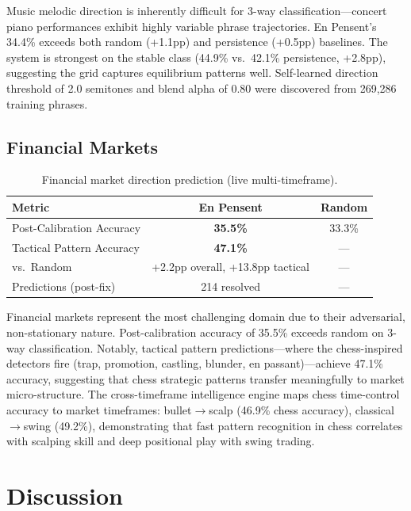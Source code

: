 \documentclass[11pt,a4paper]{article}
\begin{document}
Music melodic direction is inherently difficult for 3-way classification---concert
piano performances exhibit highly variable phrase trajectories. En Pensent's 34.4\%
exceeds both random (+1.1pp) and persistence (+0.5pp) baselines. The system is
strongest on the stable class (44.9\% vs.\ 42.1\% persistence, +2.8pp), suggesting
the grid captures equilibrium patterns well. Self-learned direction threshold of
2.0 semitones and blend alpha of 0.80 were discovered from 269,286 training phrases.

\subsection{Financial Markets}

\begin{table}[h]
\centering
\caption{Financial market direction prediction (live multi-timeframe).}
\label{tab:market}
\begin{tabular}{lcc}
\toprule
\textbf{Metric} & \textbf{En Pensent} & \textbf{Random} \\
\midrule
Post-Calibration Accuracy & \textbf{35.5\%} & 33.3\% \\
Tactical Pattern Accuracy & \textbf{47.1\%} & --- \\
vs.\ Random               & +2.2pp overall, +13.8pp tactical & --- \\
Predictions (post-fix)    & 214 resolved    & --- \\
\bottomrule
\end{tabular}
\end{table}

Financial markets represent the most challenging domain due to their
adversarial, non-stationary nature. Post-calibration accuracy of 35.5\% exceeds
random on 3-way classification. Notably, tactical pattern predictions---where the
chess-inspired detectors fire (trap, promotion, castling, blunder, en passant)---achieve
47.1\% accuracy, suggesting that chess strategic patterns transfer meaningfully to
market micro-structure. The cross-timeframe intelligence engine maps chess
time-control accuracy to market timeframes: bullet$\to$scalp (46.9\% chess accuracy),
classical$\to$swing (49.2\%), demonstrating that fast pattern recognition in chess
correlates with scalping skill and deep positional play with swing trading.

\section{Discussion}
\end{document}
